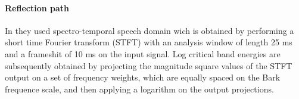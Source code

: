 \documentclass[a4paper,10pt]{article}
\begin{document}
\paragraph{Reflection path} In \cite{DL_speech_reco} they used spectro-temporal speech domain wich is obtained by performing a short time Fourier transform (STFT) with an analysis window of length 25 ms and a frameshit of 10 ms on the input signal. Log critical band energies are subsequently obtained by projecting the magnitude square values of the STFT output on a set of frequency weights, which are equally spaced on the Bark frequence scale, and then applying a logarithm on the output projections.
\newpage


\end{document}
